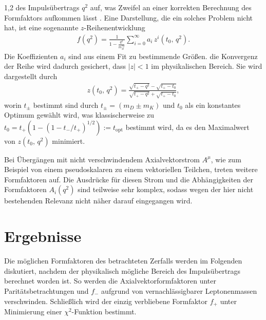 \documentclass[11pt,a4paper,twoside]{report}
\begin{document}
\begin{spacing}{1,2}
des Impulsübertrags $q^2$ auf, was Zweifel an einer korrekten Berechnung des Formfaktors aufkommen lässt \cite{PhysRev_Data}. Eine Darstellung, die ein solches Problem nicht hat,
ist eine sogenannte $z$-Reihenentwicklung \cite{formfactor_PhysRev}
\begin{align}
 f(q^2) = \frac{1}{1-\frac{q^2}{m^{*2}_D}} \sum\limits_{i=0}^\infty a_i\,z^i(t_0,\, q^2).
 \label{eq_formparam}
\end{align}
Die Koeffizienten $a_i$ sind
aus einem Fit zu bestimmende Größen. die Konvergenz der Reihe wird dadurch gesichert, dass $|z|<1$ im physikalischen Bereich. Sie wird dargestellt durch
\begin{align}
 z(t_0,\, q^2)= \frac{\sqrt{t_+-q^2}-\sqrt{t_+-t_0}}{\sqrt{t_+-q^2}+\sqrt{t_+-t_0}},
 \label{eq_zexpansion}
\end{align}
worin $t_\pm$ bestimmt sind durch $t_\pm = (m_D \pm m_K)$ und $t_0$ als ein konstantes Optimum gewählt wird, was klassischerweise zu 
$t_0 = t_+(1-(1-t_-/t_+)^{1/2}):=t_{\text{opt}}$ bestimmt wird, da es den Maximalwert von $z(t_0,\, q^2)$ minimiert.

\noindent
Bei Übergängen mit nicht verschwindendem Axialvektorstrom $A^\mu$, wie zum Beispiel von einem pseudoskalaren zu einem vektoriellen Teilchen, treten 
weitere Formfaktoren auf. Die Ausdrücke für diesen Strom und die Abhängigkeiten der Formfaktoren $A_i(q^2)$ sind teilweise sehr komplex, sodass wegen
der hier nicht bestehenden Relevanz nicht näher darauf eingegangen wird.

\chapter{Ergebnisse}
Die möglichen Formfaktoren des betrachteten Zerfalls werden im Folgenden diskutiert, nachdem der physikalisch mögliche Bereich des Impulsübertrags
berechnet worden ist. So werden die Axialvektorformfaktoren unter Paritätsbetrachtungen und $f_-$ aufgrund von vernachlässigbarer Leptonenmassen verschwinden.
Schließlich wird der einzig verbliebene Formfaktor $f_+$ unter Minimierung einer $\chi^2$-Funktion bestimmt.

\end{spacing}
\end{document}
